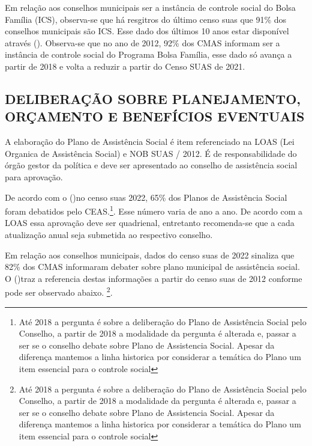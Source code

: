 \documentclass[
  brazilian]{report}
\begin{document}
Em relação aos conselhos municipais ser a instância de controle social
do Bolsa Família (ICS), observa-se que há resgitros do último censo suas
que 91\% dos conselhos municipais são ICS. Esse dado dos últimos 10 anos
estar disponível através (). Observa-se que no ano
de 2012, 92\% dos CMAS informam ser a instância de controle social do
Programa Bolsa Família, esse dado só avança a partir de 2018 e volta a
reduzir a partir do Censo SUAS de 2021.

\hypertarget{deliberauxe7uxe3o-sobre-planejamento-oruxe7amento-e-benefuxedcios-eventuais}{%
\subsection{DELIBERAÇÃO SOBRE PLANEJAMENTO, ORÇAMENTO E BENEFÍCIOS
EVENTUAIS}\label{deliberauxe7uxe3o-sobre-planejamento-oruxe7amento-e-benefuxedcios-eventuais}}

A elaboração do Plano de Assistência Social é item referenciado na LOAS
(Lei Organica de Assistência Social) e NOB SUAS / 2012. É de
responsabilidade do órgão gestor da política e deve ser apresentado ao
conselho de assistência social para aprovação.

De acordo com o ()no censo suas 2022, 65\% dos
Planos de Assistência Social foram debatidos pelo
CEAS.\footnote{Até 2018 a pergunta é sobre a deliberação do Plano de Assistência Social pelo Conselho, a partir de 2018 a modalidade da pergunta é alterada e, passar a ser se o conselho debate sobre Plano de Assistencia Social. Apesar da diferença mantemos a linha historica por considerar a temática do Plano um item essencial para o controle social}.
Esse número varia de ano a ano. De acordo com a LOAS essa aprovação deve
ser quadrienal, entretanto recomenda-se que a cada atualização anual
seja submetida ao respectivo conselho.

Em relação aos conselhos municipais, dados do censo suas de 2022
sinaliza que 82\% dos CMAS informaram debater sobre plano municipal de
assistência social. O ()traz a referencia destas
informações a partir do censo suas de 2012 conforme pode ser observado
abaixo.
\footnote{Até 2018 a pergunta é sobre a deliberação do Plano de Assistência Social pelo Conselho, a partir de 2018 a modalidade da pergunta é alterada e, passar a ser se o conselho debate sobre Plano de Assistencia Social. Apesar da diferença mantemos a linha historica por considerar a temática do Plano um item essencial para o controle social}.
\end{document}
